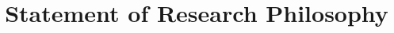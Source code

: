 \documentclass[11pt]{article}
\begin{document}
\title{Statement of Research Philosophy}
\date{}
\maketitle

\end{document}
